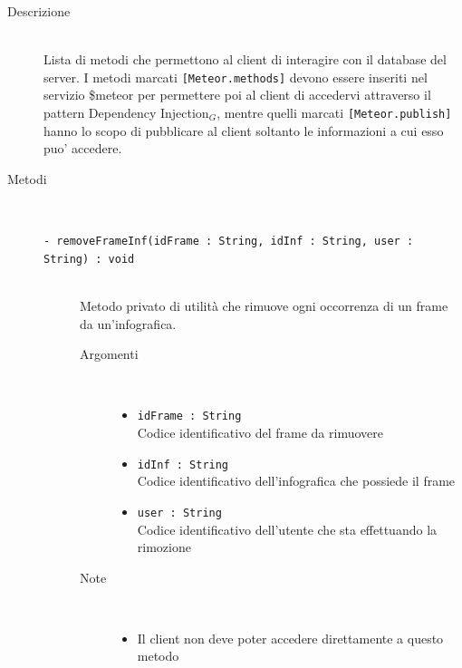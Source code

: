 \begin{description}
\item[Descrizione] \hfill \\
	Lista di metodi che permettono al client di interagire con il database del server. I metodi marcati \texttt{[Meteor.methods]} devono essere inseriti nel servizio \$meteor per permettere poi al client di accedervi attraverso il pattern Dependency Injection$_G$, mentre quelli marcati \texttt{[Meteor.publish]} hanno lo scopo di pubblicare al client soltanto le informazioni a cui esso puo' accedere.
	
	
\item[Metodi] \hfill \\

	\begin{description}
		\item[\texttt{- removeFrameInf(idFrame : String, idInf : String, user : String) : void			}] \hfill \\
			Metodo privato di utilità che rimuove ogni occorrenza di un frame da un'infografica.
			
		\begin{description}
			\item[Argomenti] \hfill \\
				\begin{itemize}
				
					\item \texttt{idFrame : String			} \hfill \\
					Codice identificativo del frame da rimuovere
					\item \texttt{idInf : String		} \hfill \\
					Codice identificativo dell'infografica che possiede il frame
					\item \texttt{user : String			} \hfill \\
					Codice identificativo dell'utente che sta effettuando la rimozione
					
				\end{itemize}
			\item[Note] \hfill \\
			\begin{itemize}
					\item Il client non deve poter accedere direttamente a questo metodo
				\end{itemize}
		\end{description}
	\end{description}
	

\end{description}
